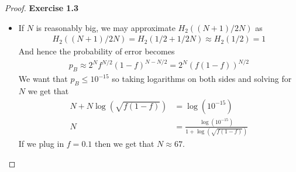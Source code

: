 \documentclass[11pt]{article}
\theoremstyle{definition}
\begin{document}
\begin{proof}{\textbf{Exercise 1.3}}
\begin{itemize}
\cleardoublepage
\item [(d)] If $N$ is reasonably big, we may approximate $H_2((N+1)/2N)$ as
\begin{align*}
    H_2((N+1)/2N) = H_2(1/2+1/2N) \approx H_2(1/2) = 1
\end{align*}
And hence the probability of error becomes
\begin{align*}
    p_B \approx 2^N f^{N/2}(1 - f)^{N - N/2} = 2^N (f(1-f))^{N/2} 
\end{align*}
We want that $p_B \leq 10^{-15}$ so taking logarithms on both sides and
solving for $N$ we get that
\begin{align*}
    N + N \log(\sqrt{f(1-f)}) &= \log(10^{-15})\\
    N &= \frac{\log(10^{-15})}{1 + \log(\sqrt{f(1-f)})}
\end{align*}
If we plug in $f = 0.1$ then we get that $N \approx 67$.
\end{itemize}
\end{proof}
\end{document}
